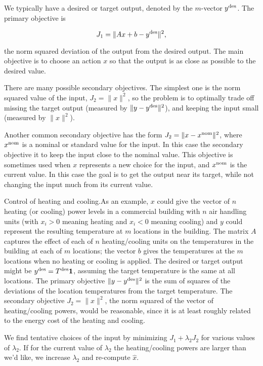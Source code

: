 We typically have a desired or target output, denoted by the \(m\)-vector \(y^{\rm des}\). The primary objective is

\[J_{1}=\|Ax+b-y^{\rm des}\|^{2},\]

the norm squared deviation of the output from the desired output. The main objective is to choose an action \(x\) so that the output is as close as possible to the desired value.

There are many possible secondary objectives. The simplest one is the norm squared value of the input, \(J_{2}=\|x\|^{2}\), so the problem is to optimally trade off missing the target output (measured by \(\|y-y^{\rm des}\|^{2}\)), and keeping the input small (measured by \(\|x\|^{2}\)).

Another common secondary objective has the form \(J_{2}=\|x-x^{\rm nom}\|^{2}\), where \(x^{\rm nom}\) is a nominal or standard value for the input. In this case the secondary objective it to keep the input close to the nominal value. This objective is sometimes used when \(x\) represents a new choice for the input, and \(x^{\rm nom}\) is the current value. In this case the goal is to get the output near its target, while not changing the input much from its current value.

Control of heating and cooling.As an example, \(x\) could give the vector of \(n\) heating (or cooling) power levels in a commercial building with \(n\) air handling units (with \(x_{i}>0\) meaning heating and \(x_{i}<0\) meaning cooling) and \(y\) could represent the resulting temperature at \(m\) locations in the building. The matrix \(A\) captures the effect of each of \(n\) heating/cooling units on the temperatures in the building at each of \(m\) locations; the vector \(b\) gives the temperatures at the \(m\) locations when no heating or cooling is applied. The desired or target output might be \(y^{\rm des}=T^{\rm des}\mathbf{1}\), assuming the target temperature is the same at all locations. The primary objective \(\|y-y^{\rm des}\|^{2}\) is the sum of squares of the deviations of the location temperatures from the target temperature. The secondary objective \(J_{2}=\|x\|^{2}\), the norm squared of the vector of heating/cooling powers, would be reasonable, since it is at least roughly related to the energy cost of the heating and cooling.

We find tentative choices of the input by minimizing \(J_{1}+\lambda_{2}J_{2}\) for various values of \(\lambda_{2}\). If for the current value of \(\lambda_{2}\) the heating/cooling powers are larger than we'd like, we increase \(\lambda_{2}\) and re-compute \(\hat{x}\).

